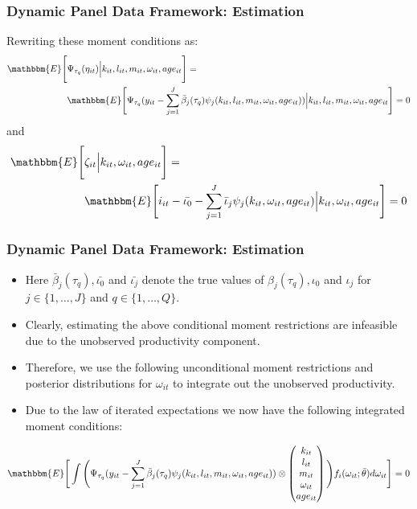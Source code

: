\documentclass{beamer}
\begin{document}

\begin{frame}
\frametitle{Dynamic Panel Data Framework: Estimation}
Rewriting these moment conditions as:
\begin{equation}\label{ymoment}
\begin{split}
\mathbbm{E}\Bigg[&\Psi_{\tau_{q}}(\eta_{it})\Big|k_{it}, l_{it}, m_{it}, \omega_{it}, age_{it}\Bigg]=\\
&\mathbbm{E}\Bigg[\Psi_{\tau_{q}}(y_{it}-\sum_{j=1}^{J}\bar{\beta}_{j}(\tau_{q})\psi_{j}(k_{it}, l_{it}, m_{it}, \omega_{it}, age_{it}))\Big|k_{it}, l_{it}, m_{it}, \omega_{it}, age_{it}\Bigg]=0
\end{split}
\end{equation}
and 
\begin{equation}\label{imoment}
\begin{split}
\mathbbm{E}\Bigg[&\zeta_{it}\Big|k_{it}, \omega_{it}, age_{it}\Bigg]=\\
&\mathbbm{E}\Bigg[i_{it}-\bar{\iota_{0}}-\sum_{j=1}^{J}\bar{\iota}_{j}\psi_{j}(k_{it}, \omega_{it}, age_{it})\Big|k_{it}, \omega_{it}, age_{it}\Bigg]=0
\end{split}
\end{equation}
\end{frame}


\begin{frame}
\frametitle{Dynamic Panel Data Framework: Estimation}
\begin{itemize}
	\item Here $\bar{\beta}_{j}(\tau_{q}), \bar{\iota_{0}}$ and $\bar{\iota_{j}}$ denote the true values of $\beta_{j}(\tau_{q}), \iota_{0}$ and $\iota_{j}$ for $j\in\{1,\dots, J\}$ and $q\in\{1,\dots,Q\}$. 
	\item Clearly, estimating the above conditional moment restrictions are infeasible due to the unobserved productivity component. 
	\item Therefore, we use the following unconditional moment restrictions and posterior distributions for $\omega_{it}$ to integrate out the unobserved productivity. 
	\item Due to the law of iterated expectations we now have the following integrated moment conditions:
\end{itemize}
\small
\begin{equation}\label{yimc}
\mathbbm{E}\Bigg[\int\Bigg(\Psi_{\tau_{q}}(y_{it}-\sum_{j=1}^{J}\bar{\beta}_{j}(\tau_{q})\psi_{j}(k_{it}, l_{it}, m_{it}, \omega_{it}, age_{it}))\otimes
\begin{pmatrix}
k_{it} \\
l_{it}\\
m_{it} \\
\omega_{it} \\
age_{it}
\end{pmatrix}
\Bigg)f_{i}(\omega_{it};\bar{\theta})d\omega_{it}\Bigg]=0
\end{equation}
\end{frame}
\end{document}
